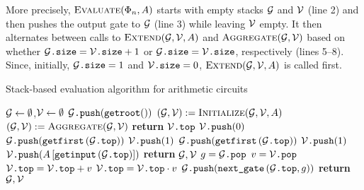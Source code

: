 More precisely, $\textsc{Evaluate}(\Phi_n,A)$ starts with empty stacks $\mathcal{G}$ and $\mathcal{V}$ (line 2) and then pushes the output
gate to $\mathcal{G}$ (line 3) while leaving $\mathcal{V}$ empty. It then alternates between calls to $\textsc{Extend}(\mathcal{G},\mathcal{V},A)$ and $\textsc{Aggregate}(\mathcal{G},\mathcal{V})$ based on whether $\mathcal{G}\texttt{.size} = \mathcal{V}\texttt{.size}+1$ or $\mathcal{G}\texttt{.size} = \mathcal{V}\texttt{.size}$, respectively (lines 5--8). Since, initially, $\mathcal{G}\texttt{.size}=1$ and $\mathcal{V}\texttt{.size}=0$, $\textsc{Extend}(\mathcal{G},\mathcal{V},A)$ is
called first.
 \begin{algorithm}[t]
  \caption{Stack-based evaluation algorithm for arithmetic circuits}
 \label{alg:eval_code}
 \begin{algorithmic}[1]
   \State $\mathcal{G}\gets\emptyset$,$\mathcal{V}\gets\emptyset$
    \State $\mathcal{G}\texttt{.push}(\texttt{getroot}())$ 
             \State $(\mathcal{G},\mathcal{V}) := \textsc{Initialize}(\mathcal{G},\mathcal{V},A)$
         \Else
             \State $(\mathcal{G},\mathcal{V}):= \textsc{Aggregate}(\mathcal{G},\mathcal{V})$
         \EndIf
     \EndWhile
     \State \textbf{return} $\mathcal{V}\texttt{.top}$
 \EndFunction
     \If{$\isplus{\gettop{\cG}}$} 
         \State $\mathcal{V}\texttt{.push}(0)$
         \State $\mathcal{G}\texttt{.push}(\texttt{getfirst}\left(\mathcal{G}\texttt{.top} \right))$ 
     \ElsIf{$\isprod{\gettop{\cG}}$} 
         \State $\mathcal{V}\texttt{.push}(1)$
         \State $\mathcal{G}\texttt{.push}(\texttt{getfirst}\left(\mathcal{G}\texttt{.top} \right))$
     \ElsIf{$\isone{\gettop{\cG}}$} 
         \State $\mathcal{V}\texttt{.push}(1)$
     \ElsIf{$\isinput{\gettop{\cG}}$} 
         \State $\mathcal{V}\texttt{.push}(A\left[ \texttt{getinput}\left(\mathcal{G}\texttt{.top} \right) \right])$ 
     \EndIf
     \State \textbf{return} $\mathcal{G}, \mathcal{V}$
 \EndFunction
     \State $g = \mathcal{G}\texttt{.pop}$
     \State $v = \mathcal{V}\texttt{.pop}$
     \If{$\isplus{\gettop{\cG}}$}
         \State $\mathcal{V}\texttt{.top} = \mathcal{V}\texttt{.top} + v$
     \ElsIf{$\isprod{\gettop{\cG}}$}
         \State $\mathcal{V}\texttt{.top} = \mathcal{V}\texttt{.top} \cdot v$
     \EndIf
      
         \State $\mathcal{G}\texttt{.push}(\texttt{next{\_}gate}\left(\mathcal{G}\texttt{.top}, g \right))$ 
     \EndIf
     \State \textbf{return} $\mathcal{G}, \mathcal{V}$
 \EndFunction
  \end{algorithmic}
 \end{algorithm}
